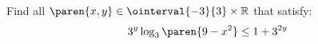 Find all $\paren{x, y} \in \ointerval{-3}{3} \times \mathbb{R}$ that satisfy:
\begin{equation*}
 3^y \log_3\paren{9 - x^2} \leq 1 + 3^{2y}
\end{equation*}
